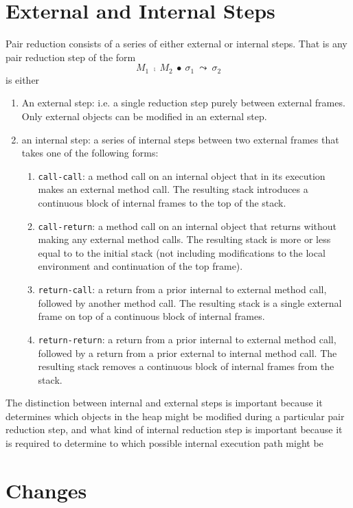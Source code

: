 \documentclass[12pt]{article}
\begin{document}
\section{External and Internal Steps}

Pair reduction consists of a series of either external or internal steps. That is any pair reduction step of the form
$$M_1\ \fcmp\ M_2\ \bullet\ \sigma_1\ \leadsto\ \sigma_2$$
is either
\begin{enumerate}
\item
An external step: i.e. a single reduction step purely between external frames. Only external objects can be modified in an external step.
\item
an internal step: a series of internal steps between two external frames that takes one of the following forms:
\begin{enumerate}
\item \texttt{call-call}: a method call on an internal object that in its execution makes an external method call. The resulting stack introduces a continuous block of internal frames  to the top of the stack.
\item \texttt{call-return}: a method call on an internal object that returns without making any external method calls. 
The resulting stack is more or less equal to to the initial stack (not including modifications to the local environment and continuation of the top frame).
\item \texttt{return-call}: a return from a prior internal to external method call, followed by another method call. The resulting stack is  a single external frame on top of a continuous block of internal frames.
\item \texttt{return-return}: a return from a prior internal to external method call, followed by a return from a prior external to internal method call. The resulting stack removes a continuous block of internal frames from the stack.
\end{enumerate}
\end{enumerate}

The distinction between internal and external steps is important because it determines which objects in the heap might be modified during a particular pair reduction step, and what kind of internal reduction step is important because it is required to determine to which possible internal execution path might be 


\section{Changes}
\end{document}
